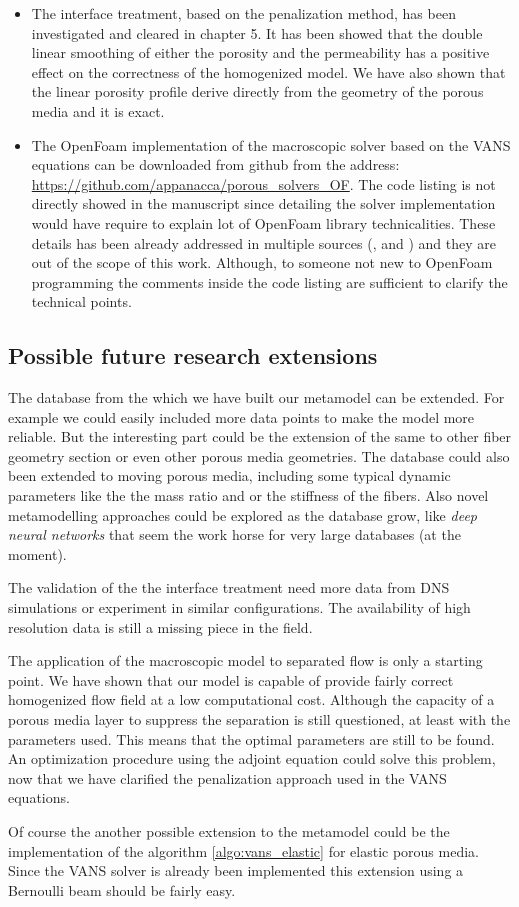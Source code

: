 \begin{itemize}
\item The interface treatment, based on the penalization method, has been investigated and cleared in chapter 5. It has been showed that the double linear smoothing of either the porosity and the permeability has a positive effect on the correctness of the homogenized model. We have also shown that the linear porosity profile derive directly from the geometry of the porous media and it is exact.

\item The OpenFoam implementation of the macroscopic solver based on the VANS equations can be downloaded from github from the address: \url{https://github.com/appanacca/porous_solvers_OF}.
The code listing is not directly showed in the manuscript since detailing the solver implementation would have require to explain lot of OpenFoam library technicalities. These details has been already addressed in multiple sources (\citet{jasak1996error}, \citet{moukalled2016finite} and \cite{maric2014openfoam}) and they are out of the scope of this work.
Although, to someone not new to OpenFoam programming the comments inside the code listing are sufficient to clarify the technical points.
\end{itemize}


\subsection{Possible future research extensions}



The database from the which we have built our metamodel can be extended. For example we could easily included more data points to make the model more reliable. But the interesting part could be the extension of the same to other fiber geometry section or even other porous media geometries.
The database could also been extended to moving porous media, including some typical dynamic parameters like the the mass ratio and or the stiffness of the fibers.
Also novel metamodelling approaches could be explored as the database grow, like \textit{deep neural networks} that seem the work horse for very large databases (at the moment).

The validation of the the interface treatment need more data from DNS simulations or experiment in similar configurations. The availability of high resolution data is still a missing piece in the field.

The application of the macroscopic model to separated flow is only a starting point. We have shown that our model is capable of provide fairly correct homogenized flow field at a low computational cost. Although the capacity of a porous media layer to suppress the separation is still questioned, at least with the parameters used. This means that the optimal parameters are still to be found. An optimization procedure using the adjoint equation could solve this problem, now that we have clarified the penalization approach used in the VANS equations.

Of course the another possible extension to the metamodel could be the implementation of the algorithm \ref{algo:vans_elastic} for elastic porous media. Since the VANS solver is already been implemented this extension using a Bernoulli beam should be fairly easy.
